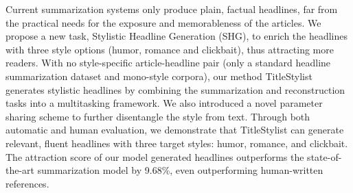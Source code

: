Current summarization systems only produce plain, factual headlines, far from the practical needs for the exposure and memorableness of the articles. We propose a new task, Stylistic Headline Generation (SHG), to enrich the headlines with three style options (humor, romance and clickbait), thus attracting more readers. With no style-specific article-headline pair (only a standard headline summarization dataset and mono-style corpora), our method TitleStylist generates stylistic headlines by combining the summarization and reconstruction tasks into a multitasking framework. We also introduced a novel parameter sharing scheme to further disentangle the style from text. Through both automatic and human evaluation, we demonstrate that TitleStylist can generate relevant, fluent headlines with three target styles: humor, romance, and clickbait. The attraction score of our model generated headlines outperforms the state-of-the-art summarization model by 9.68\%, even outperforming human-written references.
